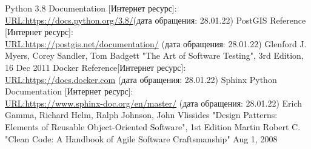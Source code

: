 \begin{thebibliography}{8}
	 Python 3.8 Documentation [Интернет ресурс]:\\
	\url{URL:https://docs.python.org/3.8/}(дата обращения: 28.01.22)
	 PostGIS Reference [Интернет ресурс]:\\
	\url{URL:https://postgis.net/documentation/} (дата обращения: 28.01.22)
	Glenford J. Myers, Corey Sandler, Tom Badgett "The Art of Software Testing", 3rd Edition, 16 Dec 2011
	 Docker Reference[Интернет ресурс]:\\
	\url{URL:https://docs.docker.com} (дата обращения: 28.01.22)
	 Sphinx Python Documentation [Интернет ресурс]:\\
	\url{URL:https://www.sphinx-doc.org/en/master/} (дата обращения: 28.01.22)
	Erich Gamma, Richard Helm, Ralph Johnson, John Vlissides
	"Design Patterns: Elements of Reusable Object-Oriented Software", 1st Edition
	Martin Robert C. "Clean Code: A Handbook of Agile Software Craftsmanship" Aug 1, 2008
\end{thebibliography}
